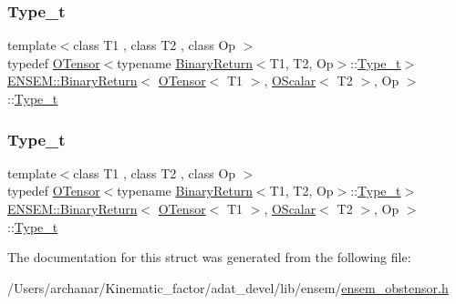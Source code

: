 \subsubsection{\texorpdfstring{Type\_t}{Type\_t}\hspace{0.1cm}{\footnotesize\ttfamily [1/2]}}
{\footnotesize\ttfamily template$<$class T1 , class T2 , class Op $>$ \\
typedef \mbox{\hyperlink{classENSEM_1_1OTensor}{O\+Tensor}}$<$typename \mbox{\hyperlink{structENSEM_1_1BinaryReturn}{Binary\+Return}}$<$T1, T2, Op$>$\+::\mbox{\hyperlink{structENSEM_1_1BinaryReturn_3_01OTensor_3_01T1_01_4_00_01OScalar_3_01T2_01_4_00_01Op_01_4_a555600e8b3228e054f9ca8d560b36469}{Type\+\_\+t}}$>$ \mbox{\hyperlink{structENSEM_1_1BinaryReturn}{E\+N\+S\+E\+M\+::\+Binary\+Return}}$<$ \mbox{\hyperlink{classENSEM_1_1OTensor}{O\+Tensor}}$<$ T1 $>$, \mbox{\hyperlink{classENSEM_1_1OScalar}{O\+Scalar}}$<$ T2 $>$, Op $>$\+::\mbox{\hyperlink{structENSEM_1_1BinaryReturn_3_01OTensor_3_01T1_01_4_00_01OScalar_3_01T2_01_4_00_01Op_01_4_a555600e8b3228e054f9ca8d560b36469}{Type\+\_\+t}}}

\mbox{\label{structENSEM_1_1BinaryReturn_3_01OTensor_3_01T1_01_4_00_01OScalar_3_01T2_01_4_00_01Op_01_4_a555600e8b3228e054f9ca8d560b36469}} 
\subsubsection{\texorpdfstring{Type\_t}{Type\_t}\hspace{0.1cm}{\footnotesize\ttfamily [2/2]}}
{\footnotesize\ttfamily template$<$class T1 , class T2 , class Op $>$ \\
typedef \mbox{\hyperlink{classENSEM_1_1OTensor}{O\+Tensor}}$<$typename \mbox{\hyperlink{structENSEM_1_1BinaryReturn}{Binary\+Return}}$<$T1, T2, Op$>$\+::\mbox{\hyperlink{structENSEM_1_1BinaryReturn_3_01OTensor_3_01T1_01_4_00_01OScalar_3_01T2_01_4_00_01Op_01_4_a555600e8b3228e054f9ca8d560b36469}{Type\+\_\+t}}$>$ \mbox{\hyperlink{structENSEM_1_1BinaryReturn}{E\+N\+S\+E\+M\+::\+Binary\+Return}}$<$ \mbox{\hyperlink{classENSEM_1_1OTensor}{O\+Tensor}}$<$ T1 $>$, \mbox{\hyperlink{classENSEM_1_1OScalar}{O\+Scalar}}$<$ T2 $>$, Op $>$\+::\mbox{\hyperlink{structENSEM_1_1BinaryReturn_3_01OTensor_3_01T1_01_4_00_01OScalar_3_01T2_01_4_00_01Op_01_4_a555600e8b3228e054f9ca8d560b36469}{Type\+\_\+t}}}



The documentation for this struct was generated from the following file\+:\begin{DoxyCompactItemize}
\item 
/\+Users/archanar/\+Kinematic\+\_\+factor/adat\+\_\+devel/lib/ensem/\mbox{\hyperlink{lib_2ensem_2ensem__obstensor_8h}{ensem\+\_\+obstensor.\+h}}\end{DoxyCompactItemize}
